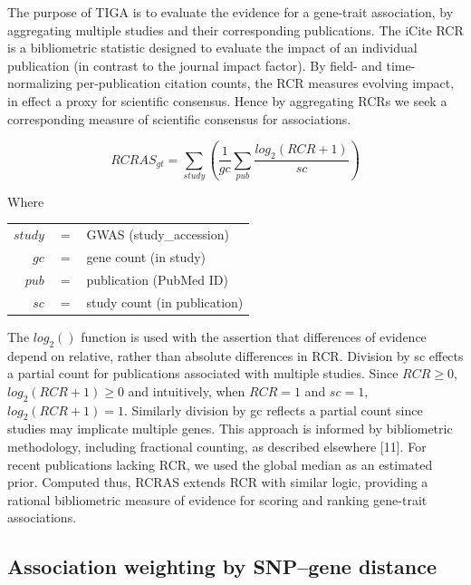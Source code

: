 The purpose of TIGA is to evaluate the evidence for a gene-trait association, by aggregating multiple studies and their corresponding publications.  The iCite RCR\cite{Hutchins2016-hs} is a bibliometric statistic designed to evaluate the impact of an individual publication (in contrast to the journal impact factor).  By field- and time-normalizing per-publication citation counts, the RCR measures evolving impact, in effect a proxy for scientific consensus.  Hence by aggregating RCRs we seek a corresponding measure of scientific consensus for associations.

\begin{equation} RCRAS_{gt} = \sum_{study} \left(\frac{1}{gc} \sum_{pub} \frac{log_{2}(RCR + 1)}{sc}\right)
\end{equation}

Where \\
\begin{center}
\begin{tabular}{ r c l }
    $study$ & $=$ & GWAS (study\_accession) \\
	$gc$ & $=$ & gene count (in study)	\\
	$pub$ & $=$ & publication (PubMed ID)	\\
	$sc$ & $=$ & study count (in publication)	\\
\end{tabular}
\end{center}

The $log_2()$ function is used with the assertion that differences of evidence depend on relative, rather than absolute differences in RCR. Division by sc effects a partial count for publications associated with multiple studies.  Since $RCR \geq 0$, $log_2(RCR + 1) \geq 0$ and intuitively, when $RCR = 1$ and $sc = 1$, $log_2(RCR + 1) = 1$. Similarly division by gc reflects a partial count since studies may implicate multiple genes. This approach is informed by bibliometric methodology, including fractional counting, as described elsewhere [11]. For recent publications lacking RCR, we used the global median as an estimated prior. Computed thus, RCRAS extends RCR with similar logic, providing a rational bibliometric measure of evidence for scoring and ranking gene-trait associations. 

\subsection{Association weighting by SNP–gene distance}


